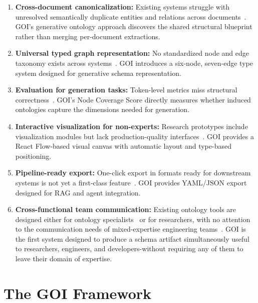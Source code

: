 \documentclass[runningheads,a4paper]{llncs}
\begin{document}
\begin{enumerate}[leftmargin=*]
  \item \textbf{Cross-document canonicalization:} Existing systems
    struggle with unresolved semantically duplicate entities and
    relations across documents~\cite{lairgi2024itext2kg,wang2024autoclusre,zhang2024edc}.
    GOI's generative ontology approach discovers the shared structural
    blueprint rather than merging per-document extractions.
  \item \textbf{Universal typed graph representation:} No standardized
    node and edge taxonomy exists across
    systems~\cite{lo2024endtoend,bai2024autoschemakg}. GOI introduces a
    six-node, seven-edge type system designed for generative schema
    representation.
  \item \textbf{Evaluation for generation tasks:} Token-level metrics
    miss structural correctness~\cite{lo2024endtoend}. GOI's Node
    Coverage Score directly measures whether induced ontologies capture
    the dimensions needed for generation.
  \item \textbf{Interactive visualization for non-experts:} Research
    prototypes include visualization modules but lack production-quality
    interfaces~\cite{lairgi2024itext2kg,abolhasani2025ontokgen,hemid2024kgraphx}.
    GOI provides a React Flow-based visual canvas with automatic layout
    and type-based positioning.
  \item \textbf{Pipeline-ready export:} One-click export in formats
    ready for downstream systems is not yet a first-class
    feature~\cite{lairgi2024itext2kg,tudorache2013webprotege}. GOI provides
    YAML/JSON export designed for RAG and agent integration.
  \item \textbf{Cross-functional team communication:} Existing ontology
    tools are designed either for ontology
    specialists~\cite{musen2015protege} or for researchers, with no
    attention to the communication needs of mixed-expertise engineering
    teams~\cite{hemid2024kgraphx,tudorache2013webprotege,sadeh2024schemex}.
    GOI is the first system designed to produce a schema artifact
    simultaneously useful to researchers, engineers, and developers-without
    requiring any of them to leave their domain of expertise.
\end{enumerate}

\section{The GOI Framework}
\label{sec:framework}
\end{document}
